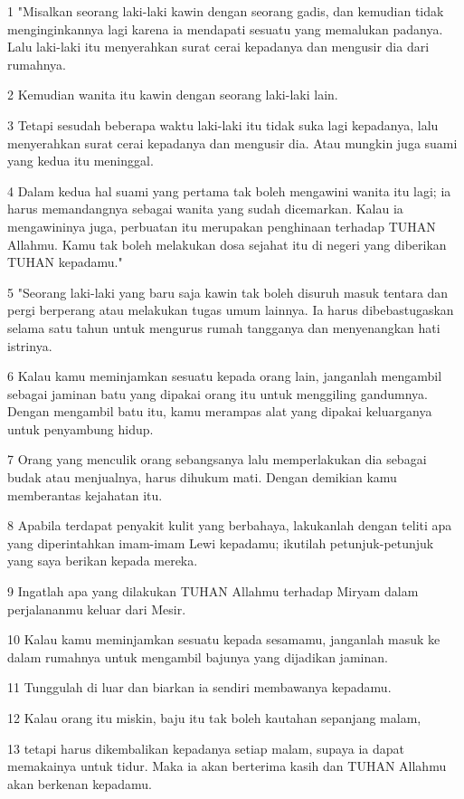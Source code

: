 \par 1 "Misalkan seorang laki-laki kawin dengan seorang gadis, dan kemudian tidak menginginkannya lagi karena ia mendapati sesuatu yang memalukan padanya. Lalu laki-laki itu menyerahkan surat cerai kepadanya dan mengusir dia dari rumahnya.
\par 2 Kemudian wanita itu kawin dengan seorang laki-laki lain.
\par 3 Tetapi sesudah beberapa waktu laki-laki itu tidak suka lagi kepadanya, lalu menyerahkan surat cerai kepadanya dan mengusir dia. Atau mungkin juga suami yang kedua itu meninggal.
\par 4 Dalam kedua hal suami yang pertama tak boleh mengawini wanita itu lagi; ia harus memandangnya sebagai wanita yang sudah dicemarkan. Kalau ia mengawininya juga, perbuatan itu merupakan penghinaan terhadap TUHAN Allahmu. Kamu tak boleh melakukan dosa sejahat itu di negeri yang diberikan TUHAN kepadamu."
\par 5 "Seorang laki-laki yang baru saja kawin tak boleh disuruh masuk tentara dan pergi berperang atau melakukan tugas umum lainnya. Ia harus dibebastugaskan selama satu tahun untuk mengurus rumah tangganya dan menyenangkan hati istrinya.
\par 6 Kalau kamu meminjamkan sesuatu kepada orang lain, janganlah mengambil sebagai jaminan batu yang dipakai orang itu untuk menggiling gandumnya. Dengan mengambil batu itu, kamu merampas alat yang dipakai keluarganya untuk penyambung hidup.
\par 7 Orang yang menculik orang sebangsanya lalu memperlakukan dia sebagai budak atau menjualnya, harus dihukum mati. Dengan demikian kamu memberantas kejahatan itu.
\par 8 Apabila terdapat penyakit kulit yang berbahaya, lakukanlah dengan teliti apa yang diperintahkan imam-imam Lewi kepadamu; ikutilah petunjuk-petunjuk yang saya berikan kepada mereka.
\par 9 Ingatlah apa yang dilakukan TUHAN Allahmu terhadap Miryam dalam perjalananmu keluar dari Mesir.
\par 10 Kalau kamu meminjamkan sesuatu kepada sesamamu, janganlah masuk ke dalam rumahnya untuk mengambil bajunya yang dijadikan jaminan.
\par 11 Tunggulah di luar dan biarkan ia sendiri membawanya kepadamu.
\par 12 Kalau orang itu miskin, baju itu tak boleh kautahan sepanjang malam,
\par 13 tetapi harus dikembalikan kepadanya setiap malam, supaya ia dapat memakainya untuk tidur. Maka ia akan berterima kasih dan TUHAN Allahmu akan berkenan kepadamu.
